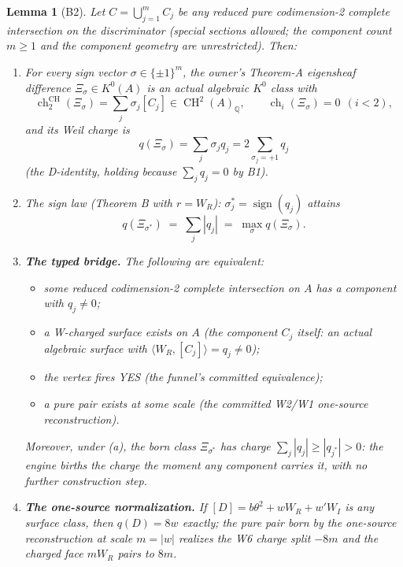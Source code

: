 \documentclass[11pt]{article}
\newtheorem{lemma}{Lemma}[section]
\newcommand{\WR}{W_R}
\newcommand{\WI}{W_I}
\newcommand{\ch}{\operatorname{ch}}
\newcommand{\KA}{A}
\newcommand{\CH}{\operatorname{CH}}
\begin{document}
\begin{lemma}[B2]
Let $C = \bigcup_{j=1}^m C_j$ be any reduced pure codimension-2 complete
intersection on the discriminator (special sections allowed; the component
count $m \ge 1$ and the component geometry are unrestricted). Then:
\begin{enumerate}
\item[(i)] For every sign vector $\sigma \in \{\pm 1\}^m$, the owner's
Theorem-A eigensheaf difference $\Xi_\sigma \in K^0(\KA)$ is an actual
algebraic $K^0$ class with
\[
\ch^{\CH}_2(\Xi_\sigma) = \sum_j \sigma_j [C_j] \in \CH^2(\KA)_{\mathbb Q},
\qquad \ch_i(\Xi_\sigma) = 0 \ \ (i < 2),
\]
and its Weil charge is
\[
q(\Xi_\sigma) = \sum_j \sigma_j q_j = 2\!\!\sum_{\sigma_j = +1}\!\! q_j
\]
(the D-identity, holding because $\sum_j q_j = 0$ by B1).
\item[(ii)] The sign law (Theorem B with $r = \WR$): $\sigma^*_j =
\operatorname{sign}(q_j)$ attains
\[
q(\Xi_{\sigma^*}) \;=\; \sum_j |q_j| \;=\; \max_{\sigma} q(\Xi_\sigma).
\]
\item[(iii)] \textbf{The typed bridge.} The following are equivalent:
\begin{itemize}
\item[(a)] some reduced codimension-2 complete intersection on $\KA$ has a
component with $q_j \ne 0$;
\item[(b) ]a W-charged surface exists on $\KA$ (the component $C_j$ itself:
an actual algebraic surface with $\langle \WR, [C_j]\rangle = q_j \ne 0$);
\item[(c)] the vertex fires YES (the funnel's committed equivalence);
\item[(d)] a pure pair exists at some scale (the committed W2/W1
one-source reconstruction).
\end{itemize}
Moreover, under (a), the born class $\Xi_{\sigma^*}$ has charge
$\sum_j |q_j| \ge |q_{j^*}| > 0$: the engine births the charge the moment any
component carries it, with no further construction step.
\item[(iv)] \textbf{The one-source normalization.} If $[D] = b\theta^2 +
w\WR + w'\WI$ is any surface class, then $q(D) = 8w$ exactly; the pure pair
born by the one-source reconstruction at scale $m = |w|$ realizes the W6
charge split $-8m$ and the charged face $m\WR$ pairs to $8m$.
\end{enumerate}
\end{lemma}
\end{document}
